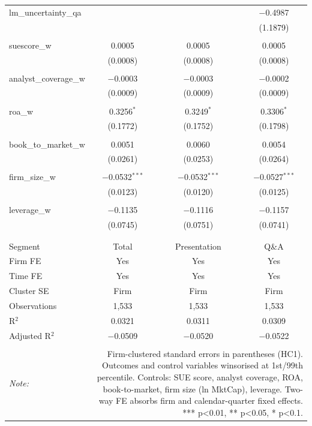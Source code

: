 \begin{table}[!htbp]
\begin{tabular}{@{\extracolsep{5pt}}lccc}
 lm\_uncertainty\_qa &  &  & $-$0.4987 \\ 
  &  &  & (1.1879) \\ 
  & & & \\ 
 suescore\_w & 0.0005 & 0.0005 & 0.0005 \\ 
  & (0.0008) & (0.0008) & (0.0008) \\ 
  & & & \\ 
 analyst\_coverage\_w & $-$0.0003 & $-$0.0003 & $-$0.0002 \\ 
  & (0.0009) & (0.0009) & (0.0009) \\ 
  & & & \\ 
 roa\_w & 0.3256$^{*}$ & 0.3249$^{*}$ & 0.3306$^{*}$ \\ 
  & (0.1772) & (0.1752) & (0.1798) \\ 
  & & & \\ 
 book\_to\_market\_w & 0.0051 & 0.0060 & 0.0054 \\ 
  & (0.0261) & (0.0253) & (0.0264) \\ 
  & & & \\ 
 firm\_size\_w & $-$0.0532$^{***}$ & $-$0.0532$^{***}$ & $-$0.0527$^{***}$ \\ 
  & (0.0123) & (0.0120) & (0.0125) \\ 
  & & & \\ 
 leverage\_w & $-$0.1135 & $-$0.1116 & $-$0.1157 \\ 
  & (0.0745) & (0.0751) & (0.0741) \\ 
  & & & \\ 
\hline \\[-1.8ex] 
Segment & Total & Presentation & Q\&A \\ 
Firm FE & Yes & Yes & Yes \\ 
Time FE & Yes & Yes & Yes \\ 
Cluster SE & Firm & Firm & Firm \\ 
Observations & 1,533 & 1,533 & 1,533 \\ 
R$^{2}$ & 0.0321 & 0.0311 & 0.0309 \\ 
Adjusted R$^{2}$ & $-$0.0509 & $-$0.0520 & $-$0.0522 \\ 
\hline 
\hline \\[-1.8ex] 
\textit{Note:}  & \multicolumn{3}{r}{Firm-clustered standard errors in parentheses (HC1). Outcomes and control variables winsorised at 1st/99th percentile. Controls: SUE score, analyst coverage, ROA, book-to-market, firm size (ln MktCap), leverage. Two-way FE absorbs firm and calendar-quarter fixed effects. *** p<0.01, ** p<0.05, * p<0.1.} \\ 
\end{tabular} 
\end{table} 
